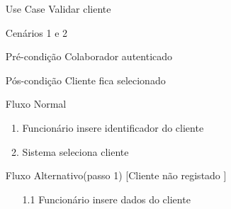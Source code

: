 \documentclass[../relatorio.tex]{subfiles}
\begin{document}
    \begin{itemize}
        \item[Use Case] {Validar cliente}
        \item[Cenários] {1 e 2}
        \item[Pré-condição] {Colaborador autenticado} 
        \item[Pós-condição] {Cliente fica selecionado}
        \item[Fluxo Normal] {
            \begin{enumerate}
                \item Funcionário insere identificador do cliente
                \item Sistema seleciona cliente
            \end{enumerate}
        }
        \item[Fluxo Alternativo(passo 1) [Cliente não registado]] {
            \begin{itemize}
                \item[1.1]{Funcionário insere dados do cliente}
            \end{itemize}
        }
    \end{itemize}
\end{document}
